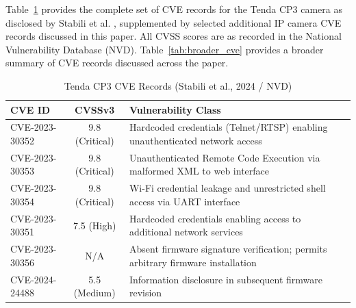 \documentclass[letterpaper, 10pt, conference]{ieeeconf}
\begin{document}
Table~\ref{tab:cve_appendix} provides the complete set of CVE records
for the Tenda CP3 camera as disclosed by Stabili et al. \cite{stabili2024},
supplemented by selected additional IP camera CVE records discussed in
this paper. All CVSS scores are as recorded in the National
Vulnerability Database (NVD). Table~\ref{tab:broader_cve} provides
a broader summary of CVE records discussed across the paper.

\begin{table}[h]
\renewcommand{\arraystretch}{1.2}
\caption{Tenda CP3 CVE Records (Stabili et al., 2024 / NVD)}
\label{tab:cve_appendix}
\centering
\small
\begin{tabular}{p{2.0cm} c p{3.8cm}}
\toprule
\textbf{CVE ID} & \textbf{CVSSv3} & \textbf{Vulnerability Class} \\
\midrule
CVE-2023-30352 & 9.8 (Critical) & Hardcoded credentials (Telnet/RTSP) enabling unauthenticated network access \\
\midrule
CVE-2023-30353 & 9.8 (Critical) & Unauthenticated Remote Code Execution via malformed XML to web interface \\
\midrule
CVE-2023-30354 & 9.8 (Critical) & Wi-Fi credential leakage and unrestricted shell access via UART interface \\
\midrule
CVE-2023-30351 & 7.5 (High)     & Hardcoded credentials enabling access to additional network services \\
\midrule
CVE-2023-30356 & N/A            & Absent firmware signature verification; permits arbitrary firmware installation \\
\midrule
CVE-2024-24488 & 5.5 (Medium)   & Information disclosure in subsequent firmware revision \\
\bottomrule
\end{tabular}
\end{table}
\end{document}
